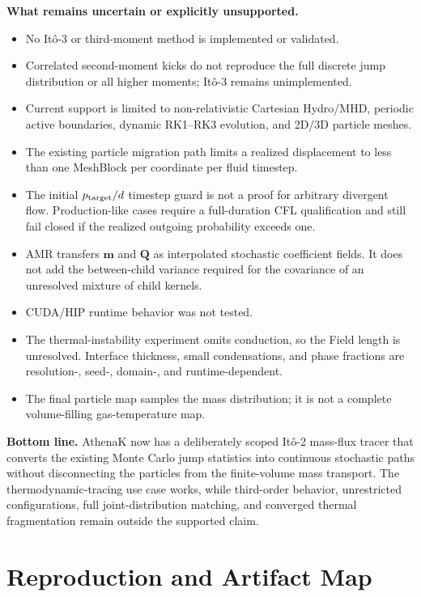 \documentclass[11pt]{article}
\newcommand{\Ito}{It\^o}
\newcommand{\AthenaK}{AthenaK}
\begin{document}
\textbf{What remains uncertain or explicitly unsupported.}
\begin{itemize}
  \item No \Ito{}-3 or third-moment method is implemented or validated.
  \item Correlated second-moment kicks do not reproduce the full discrete jump
        distribution or all higher moments; \Ito{}-3 remains unimplemented.
  \item Current support is limited to non-relativistic Cartesian Hydro/MHD,
        periodic active boundaries, dynamic RK1--RK3 evolution, and 2D/3D
        particle meshes.
  \item The existing particle migration path limits a realized displacement to
        less than one MeshBlock per coordinate per fluid timestep.
  \item The initial \(p_{\rm target}/d\) timestep guard is not a proof for
        arbitrary divergent flow. Production-like cases require a
        full-duration CFL qualification and still fail closed if the realized
        outgoing probability exceeds one.
  \item AMR transfers \(\mathbf m\) and \(\mathbf Q\) as interpolated
        stochastic coefficient fields. It does not add the between-child
        variance required for the covariance of an unresolved mixture of child
        kernels.
  \item CUDA/HIP runtime behavior was not tested.
  \item The thermal-instability experiment omits conduction, so the Field
        length is unresolved. Interface thickness, small condensations, and
        phase fractions are resolution-, seed-, domain-, and runtime-dependent.
  \item The final particle map samples the mass distribution; it is not a
        complete volume-filling gas-temperature map.
\end{itemize}

\textbf{Bottom line.} \AthenaK{} now has a deliberately scoped \Ito{}-2
mass-flux tracer that converts the existing Monte Carlo jump statistics into
continuous stochastic paths without disconnecting the particles from the
finite-volume mass transport. The thermodynamic-tracing use case works, while
third-order behavior, unrestricted configurations, full joint-distribution
matching, and converged thermal fragmentation remain outside the supported
claim.

\section{Reproduction and Artifact Map}
\end{document}
